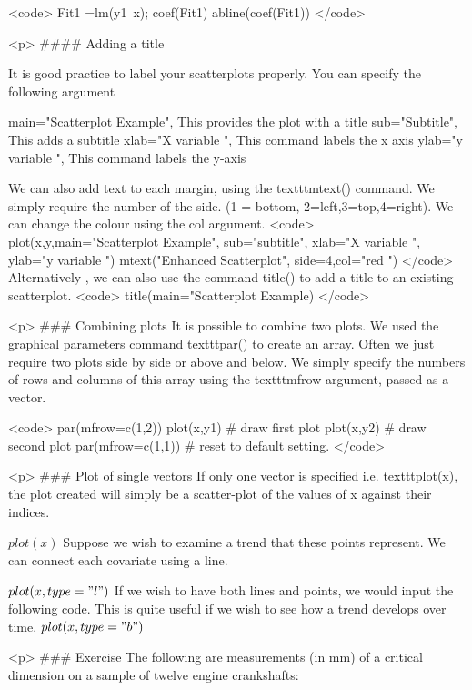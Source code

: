  <code>
Fit1 =lm(y1~x);  coef(Fit1)
abline(coef(Fit1))	
</code>

<p>
#### {Adding a title }

It is good practice to label your scatterplots properly. You can specify the following argument

      	main="Scatterplot Example", 	This provides the plot with a title
      	sub="Subtitle",   This adds a subtitle
      	xlab="X variable ",				This command labels the x axis 
  ylab="y variable ",				This command labels the y-axis

We can also add text to each margin, using the texttt{mtext()} command.  
We simply require the number of the side. (1 = bottom, 2=left,3=top,4=right). 
We can change the colour using the col argument.
 <code>
plot(x,y,main="Scatterplot Example",   sub="subtitle",    xlab="X variable ", ylab="y variable ")	
mtext("Enhanced Scatterplot", side=4,col="red ")
</code>
Alternatively , we can also use the command title() to add a title to an existing scatterplot.
 <code>
title(main="Scatterplot Example)	
</code>


<p>
### {Combining plots}
It is possible to combine two plots. We used the graphical parameters command texttt{par()} to create an array. 
Often we just require two plots side by side or above and below. We simply specify the numbers of rows and columns of this array using the texttt{mfrow} argument, passed as a vector.

<code>
par(mfrow=c(1,2))
plot(x,y1)			# draw first plot
plot(x,y2)			# draw second plot
par(mfrow=c(1,1))		# reset to default setting.
</code>

<p>
### {Plot of single vectors}
If only one vector is specified i.e. texttt{plot(x)},  the plot created will simply be a scatter-plot of the values of x against their indices.

$plot(x)$
Suppose we wish to examine a trend that these points represent. We can connect each covariate using a line.

$plot(x, type = "l")$
If we wish to have both lines and points, we would input the following code. This is quite useful if we wish to see how a trend develops over time.
$plot(x, type = "b")$









<p>
### {Exercise} The following are measurements (in mm) of a critical
dimension on a sample of twelve engine crankshafts:


